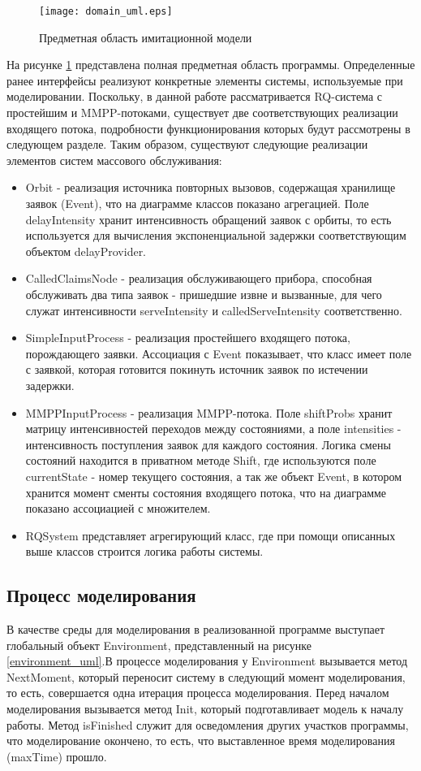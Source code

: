 \begin{figure}[H]
	\centering
	\texttt{[image: domain\_uml.eps]}
	\caption{Предметная область имитационной модели}
	\label{domain_uml}
\end{figure}
На рисунке \ref{domain_uml} представлена полная предметная область программы. Определенные ранее интерфейсы реализуют конкретные элементы системы, используемые при моделировании. Поскольку, в данной работе рассматривается RQ-система с простейшим и MMPP-потоками, существует две соответствующих реализации входящего потока, подробности функционирования которых будут рассмотрены в следующем разделе. Таким образом, существуют следующие реализации элементов систем массового обслуживания:
\begin{itemize}
	\item Orbit - реализация источника повторных вызовов, содержащая хранилище заявок (Event), что на диаграмме классов показано агрегацией. Поле delayIntensity хранит интенсивность обращений заявок с орбиты, то есть используется для вычисления экспоненциальной задержки соответствующим объектом delayProvider.
	\item CalledClaimsNode - реализация обслуживающего прибора, способная обслуживать два типа заявок - пришедшие извне и вызванные, для чего служат интенсивности serveIntensity и calledServeIntensity соответственно.
	\item SimpleInputProcess - реализация простейшего входящего потока, порождающего заявки. Ассоциация с Event показывает, что класс имеет поле с заявкой, которая готовится покинуть источник заявок по истечении задержки.
	\item MMPPInputProcess - реализация MMPP-потока. Поле shiftProbs хранит матрицу интенсивностей переходов между состояниями, а поле intensities - интенсивность поступления заявок для каждого состояния. Логика смены состояний находится в приватном методе Shift, где используются поле currentState - номер текущего состояния, а так же объект Event, в котором хранится момент сменты состояния входящего потока, что на диаграмме показано ассоциацией с множителем.
	\item RQSystem представляет агрегирующий класс, где при помощи описанных выше классов строится логика работы системы.
\end{itemize}
\clearpage
\subsection{Процесс моделирования}
В качестве среды для моделирования в реализованной программе выступает глобальный объект Environment, представленный на рисунке \ref{environment_uml}.В процессе моделирования у Environment вызывается метод NextMoment, который переносит систему в следующий момент моделирования, то есть, совершается одна итерация процесса моделирования. Перед началом моделирования вызывается метод Init, который подготавливает модель к началу работы. Метод isFinished служит для осведомления других участков программы, что моделирование окончено, то есть, что выставленное время моделирования (maxTime) прошло.

